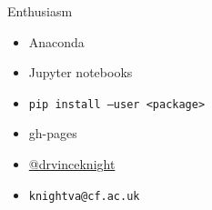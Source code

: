 \documentclass{beamer}
\begin{document}
    \begin{frame}
        \centering
        \Huge Enthusiasm
    \end{frame}

    \begin{frame}

            \begin{itemize}
                \item Anaconda
                \item Jupyter notebooks
                \item \texttt{pip install --user <package>} 
                \item gh-pages
                \item \href{https://twitter.com/drvinceknight}{@drvinceknight}
                \item \texttt{knightva@cf.ac.uk}
            \end{itemize}
    \end{frame}
\end{document}
